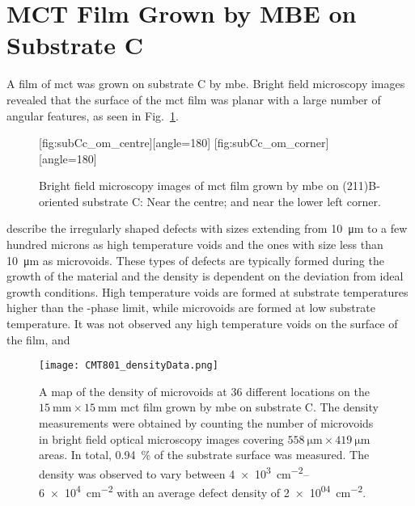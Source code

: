 \clearpage
\section{MCT Film Grown by MBE on  Substrate C}\label{sec:subCc}

A film of \acl{mct} was grown on substrate C by \ac{mbe}. Bright field microscopy images revealed that the surface of the \ac{mct} film was planar with a large number of angular features, as seen in Fig.~\ref{fig:subCc_om}.

\begin{figure}[htbp]
    \centering
    [fig:subCc_om_centre][angle=180]
    \hfill
    [fig:subCc_om_corner][angle=180]
    \caption[Bright field microscopy images of \ac{mct} film grown by \ac{mbe} on substrate AC]{Bright field microscopy images of \ac{mct} film grown by \ac{mbe} on (211)B-oriented substrate C:  Near the centre; and  near the lower left corner.}
    \label{fig:subCc_om}
\end{figure}

\citet{selvig2007defects} describe the irregularly shaped defects with sizes extending from \SI{10}{\micro\metre} to a few hundred microns as high temperature voids and the ones with size less than \SI{10}{\micro\metre} as microvoids. These types of defects are typically formed during the growth of the material and the density is dependent on the deviation from ideal growth conditions. High temperature voids are formed at substrate temperatures higher than the -phase limit, while microvoids are formed at low substrate temperature. It was not observed any high temperature voids on the surface of the film, and 


\begin{figure}[htbp]
    \centering
    \texttt{[image: CMT801\_densityData.png]}
    \caption[Map of the density of microvoids on the \ac{mct} film grown on substrate C.]{A map of the density of microvoids at 36 different locations on the $\SI{15}{\milli\metre}\times\SI{15}{\milli\metre}$ \ac{mct} film grown by \ac{mbe} on substrate C. The density measurements were obtained by counting the number of microvoids in bright field optical microscopy images covering $\SI{558}{\micro\metre}\times\SI{419}{\micro\metre}$ areas. In total, \SI{0.94}{\percent} of the substrate surface was measured. The density was observed to vary between \SIrange{4e+3}{6e+4}{\centi\metre^{-2}} with an average defect density of \SI{2e+04}{\centi\metre^{-2}}.}
    \label{fig:CMT801_densityData}
\end{figure}

